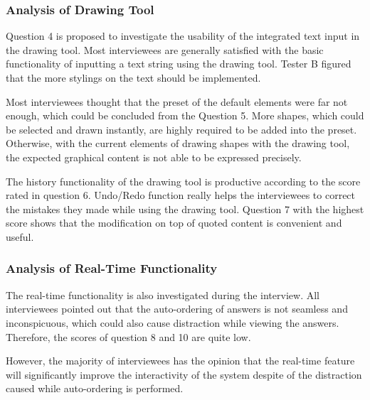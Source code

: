 \subsubsection{Analysis of Drawing Tool }
Question 4 is proposed to investigate the usability of the integrated text input in the drawing tool. Most interviewees are generally satisfied with the basic functionality of inputting a text string using the drawing tool. Tester B figured that the more stylings on the text should be implemented.

Most interviewees thought that the preset of the default elements were far not enough, which could be concluded from the Question 5. More shapes, which could be selected and drawn instantly, are highly required to be added into the preset. Otherwise, with the current elements of drawing shapes with the drawing tool, the expected graphical content is not able to be expressed precisely.

The history functionality of the drawing tool is productive according to the score rated in question 6. Undo/Redo function really helps the interviewees to correct the mistakes they made while using the drawing tool. Question 7 with the highest score shows that the modification on top of quoted content is convenient and useful.

\subsubsection{Analysis of Real-Time Functionality}

The real-time functionality is also investigated during the interview. All interviewees pointed out that the auto-ordering of answers is not seamless and inconspicuous, which could also cause distraction while viewing the answers. Therefore, the scores of question 8 and 10 are quite low.

However, the majority of interviewees has the opinion that the real-time feature will significantly improve the interactivity of the system despite of the distraction caused while auto-ordering is performed.


